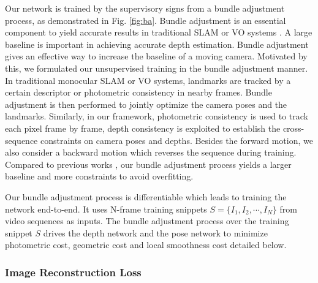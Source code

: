 \documentclass[10pt,twocolumn,letterpaper]{article}
\begin{document}
Our network is trained by the supervisory signs from a bundle adjustment process, as demonstrated in Fig. \ref{fig:ba}. Bundle adjustment is an essential component to yield accurate results in traditional SLAM or VO systems \cite{mur2017orb,engel2014lsd,engel2018direct}. A large baseline is important in achieving accurate depth estimation. Bundle adjustment gives an effective way to increase the baseline of a moving camera. Motivated by this, we formulated our unsupervised training in the bundle adjustment manner. In traditional monocular SLAM or VO systems, landmarks are tracked by a certain descriptor \cite{mur2017orb} or photometric consistency \cite{engel2014lsd,engel2018direct} in nearby frames.   Bundle adjustment is then performed to jointly optimize the camera poses and the landmarks. Similarly, in our framework, photometric consistency is used to track each pixel frame by frame, depth consistency is exploited to establish the cross-sequence constraints on  camera poses and depths. Besides the  forward motion, we also consider a backward motion which reverses the sequence during training.   Compared to  previous works \cite{zhou2017unsupervised,vijayanarasimhan2017sfm,yang2018unsupervised,yin2018geonet,zou2018df,wang2018learning,mahjourian2018unsupervised}, our bundle adjustment process yields a larger baseline and more constraints to avoid overfitting.

Our bundle adjustment process is differentiable which leads to training the network end-to-end. It uses N-frame training snippets  $S = \{ {I_1},{I_2}, \cdots ,{I_N}\} $ from video sequences as inputs. The bundle adjustment process over the training snippet $S$   drives the depth network and the pose network to minimize photometric cost, geometric cost and local smoothness cost detailed below.

\subsubsection{Image Reconstruction Loss}
\end{document}
